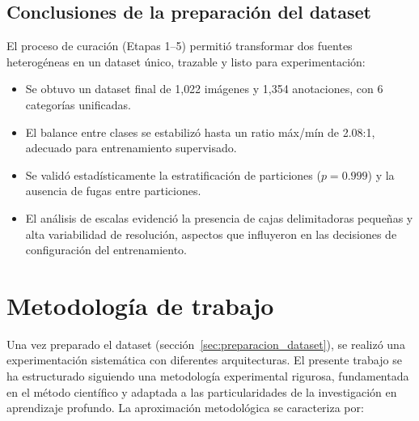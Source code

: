 \FloatBarrier
\subsection{Conclusiones de la preparación del dataset}

El proceso de curación (Etapas 1--5) permitió transformar dos fuentes heterogéneas en un dataset único, trazable y listo para experimentación:
\begin{itemize}
    \item Se obtuvo un dataset final de 1{,}022 imágenes y 1{,}354 anotaciones, con 6 categorías unificadas.
    \item El balance entre clases se estabilizó hasta un ratio máx/mín de 2.08:1, adecuado para entrenamiento supervisado.
    \item Se validó estadísticamente la estratificación de particiones ($p=0.999$) y la ausencia de fugas entre particiones.
    \item El análisis de escalas evidenció la presencia de cajas delimitadoras pequeñas y alta variabilidad de resolución, aspectos que influyeron en las decisiones de configuración del entrenamiento.
\end{itemize}

\section{Metodología de trabajo}
\label{sec:metodologia}

Una vez preparado el dataset (sección~\ref{sec:preparacion_dataset}), se realizó una experimentación sistemática con diferentes arquitecturas. El presente trabajo se ha estructurado siguiendo una metodología experimental rigurosa, fundamentada en el método científico y adaptada a las particularidades de la investigación en aprendizaje profundo. La aproximación metodológica se caracteriza por:

